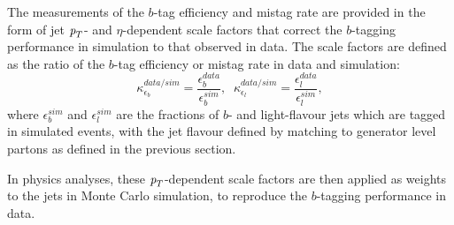 The measurements of the $b$-tag efficiency and mistag rate are provided in the form of jet ${\emph{p}_{T}}$- and $\eta$-dependent scale factors that correct the $b$-tagging performance in simulation to that observed in data.  The scale factors are defined as the ratio of the $b$-tag efficiency or mistag rate in data and simulation:
%
\begin{equation}
\kappa_{\epsilon_b}^{data/sim}  = \frac{\epsilon_b^{data}}{\epsilon_b^{sim}}, \; \;   \kappa_{\epsilon_l}^{data/sim}  = \frac{\epsilon_l^{data}}{\epsilon_l^{sim}},
\end{equation}
%
where $\epsilon_b^{sim}$ and $\epsilon_l^{sim}$ are the fractions of $b$- and light-flavour jets which are tagged in simulated events, %
 with the jet flavour defined by matching to generator level partons as defined in the previous section. %

In physics analyses, these ${\emph{p}_{T}}$-dependent scale factors are then applied as weights to the jets in Monte Carlo simulation, to reproduce the $b$-tagging performance in data.


